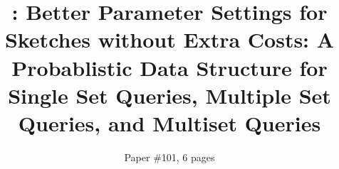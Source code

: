 \documentclass[conference]{InputFiles/IEEEtran}
\title{\fname: Better Parameter Settings for Sketches without Extra Costs}
\title{\fname: A Probablistic Data Structure for Single Set Queries, Multiple Set Queries, and Multiset Queries}
\author{Paper \#101, 6 pages}
\begin{document}
\maketitle
\sloppy
	
	
	
	
	
	
	
	
	
	\balance
	
	
\end{document}
